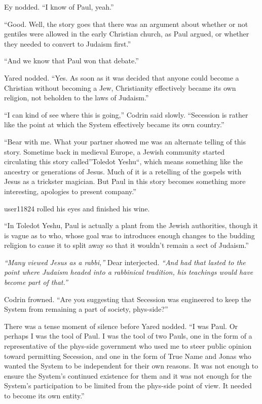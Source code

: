 Ey nodded. ``I know of Paul, yeah.''

``Good. Well, the story goes that there was an argument about whether or not gentiles were allowed in the early Christian church, as Paul argued, or whether they needed to convert to Judaism first.''

``And we know that Paul won that debate.''

Yared nodded. ``Yes. As soon as it was decided that anyone could become a Christian without becoming a Jew, Christianity effectively became its own religion, not beholden to the laws of Judaism.''

``I can kind of see where this is going,'' Codrin said slowly. ``Secession is rather like the point at which the System effectively became its own country.''

``Bear with me. What your partner showed me was an alternate telling of this story. Sometime back in medieval Europe, a Jewish community started circulating this story called''Toledot Yeshu``, which means something like the ancestry or generations of Jesus. Much of it is a retelling of the gospels with Jesus as a trickster magician. But Paul in this story becomes something more interesting, apologies to present company.''

user11824 rolled his eyes and finished his wine.

``In Toledot Yeshu, Paul is actually a plant from the Jewish authorities, though it is vague as to who, whose goal was to introduces enough changes to the budding religion to cause it to split away so that it wouldn't remain a sect of Judaism.''

\emph{``Many viewed Jesus as a rabbi,''} Dear interjected. \emph{``And had that lasted to the point where Judaism headed into a rabbinical tradition, his teachings would have become part of that.''}

Codrin frowned. ``Are you suggesting that Secession was engineered to keep the System from remaining a part of society, phys-side?''

There was a tense moment of silence before Yared nodded. ``I was Paul. Or perhaps I was the tool of Paul. I was the tool of two Pauls, one in the form of a representative of the phys-side government who used me to steer public opinion toward permitting Secession, and one in the form of True Name and Jonas who wanted the System to be independent for their own reasons. It was not enough to ensure the System's continued existence for them and it was not enough for the System's participation to be limited from the phys-side point of view. It needed to become its own entity.''

